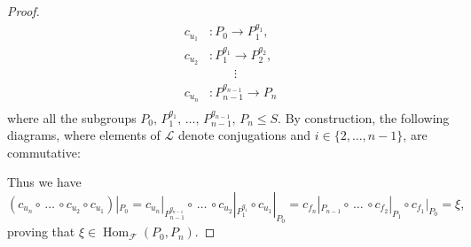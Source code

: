 \documentclass{amsart}
\numberwithin{equation}{section}
\theoremstyle{definition}
\theoremstyle{subresult}
\theoremstyle{caseresult}
\newcommand{\F}{\mathcal{F}}
\renewcommand{\L}{\mathcal{L}}
\newcommand{\Hom}{\operatorname{Hom}}
\newcommand{\inv}{^{-1}}
\newcommand{\fto}{\longrightarrow}
\newcommand{\<}{\langle}
\renewcommand{\>}{\rangle}
\begin{document}
\begin{proof}
	\begin{align*}
		c_{u_1}& \colon 	 P_0  				  \fto 		 P_1^{g_1}, \\
		c_{u_2}& \colon 	 P_1^{g_1} 		  \fto  		 P_2^{g_2}, \\
		&			\qquad			  \vdots \\
		c_{u_n}& \colon	 P_{n-1}^{g_{n-1}}   \fto 		 P_n\\
	\end{align*}
	where all the subgroups $P_0, \, P_1^{g_1}, \, \dots, \,P_{n-1}^{g_{n-1}}, \, P_n \le S$. By construction, the following diagrams, where elements of $\L$ denote conjugations and $i \in \{2,\dots,n-1\}$, are commutative:
	\begin{center}
	\end{center}
	
	Thus we have 
	\[
	(c_{u_n} \circ \, \dots \, \circ c_{u_2} \circ c_{u_1})|_{P_0} = c_{u_n}|_{P_{n-1}^{g_{n-1}}} \circ \, \dots \, \circ c_{u_2}|_{P_1^{g_1}} \circ c_{u_1}|_{P_0}  = c_{f_n}|_{P_{n-1}} \circ \, \dots \, \circ c_{f_2}|_{P_1} \circ c_{f_1}|_{P_0} = \xi,
	\]
	proving that $\xi \in \Hom_\F(P_0,P_n)$.
\end{proof}
\end{document}

